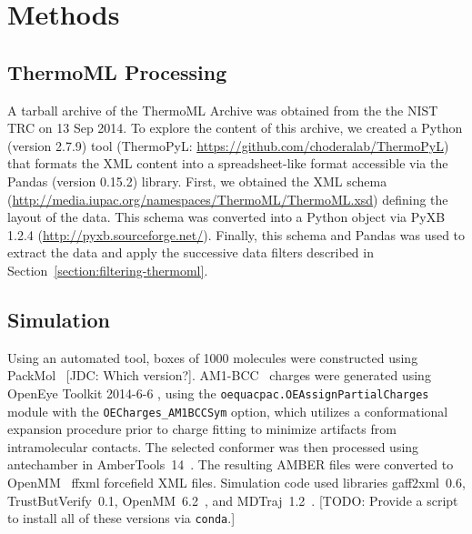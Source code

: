 \documentclass[aps,pre,twocolumn,nofootinbib,superscriptaddress,linenumbers]{revtex4-1}
\begin{document}

\section{Methods}

\subsection{ThermoML Processing}

A tarball archive of the ThermoML Archive was obtained from the the NIST TRC on 13 Sep 2014.
To explore the content of this archive, we created a Python (version 2.7.9) tool (ThermoPyL: \url{https://github.com/choderalab/ThermoPyL}) that formats the XML content into a spreadsheet-like format accessible via the Pandas (version 0.15.2) library.  
First, we obtained the XML schema (\url{http://media.iupac.org/namespaces/ThermoML/ThermoML.xsd}) defining the layout of the data.
This schema was converted into a Python object via PyXB 1.2.4 (\url{http://pyxb.sourceforge.net/}).
Finally, this schema and Pandas was used to extract the data and apply the successive data filters described in Section~\ref{section:filtering-thermoml}.  

\subsection{Simulation}
Using an automated tool, boxes of 1000 molecules were constructed using PackMol~\cite{martinez2009packmol} {\color{red}[JDC: Which version?]}. 
AM1-BCC~\cite{am1bcc1,am1bcc2} charges were generated using OpenEye Toolkit 2014-6-6 \cite{openeye}, using the {\tt oequacpac.OEAssignPartialCharges} module with the {\tt OECharges\_AM1BCCSym} option, which utilizes a conformational expansion procedure prior to charge fitting to minimize artifacts from intramolecular contacts.  
The selected conformer was then processed using antechamber in AmberTools~14~\cite{amber14}.  
The resulting AMBER files were converted to OpenMM~\cite{eastman2012openmm} ffxml forcefield XML files.  
Simulation code used libraries gaff2xml~0.6, TrustButVerify~0.1, OpenMM~6.2~\cite{eastman2012openmm}, and MDTraj~1.2~\cite{mcgibbon2014mdtraj}.  
{\color{red}[TODO: Provide a script to install all of these versions via {\tt conda}.]}
\end{document}

